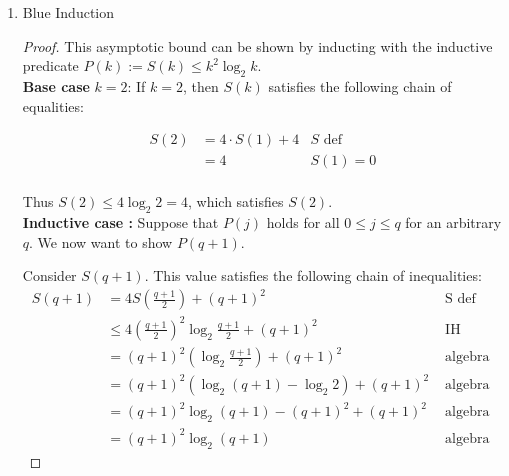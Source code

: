 \documentclass[10pt]{article}
\begin{document}
\begin{enumerate}[label={}]
\begin{proof}
                  Since the total work $k^2 \log _2 k$ is always less than or equal to $k^2 \log _2 k$ for $k \geq 1$, it follows that $S(k)=k^2 \log _2 k \in O\left(k^2 \log _2 k\right)$.

            \end{proof}

            \newpage

      \item Blue Induction
            \begin{proof}
                  This asymptotic bound can be shown by inducting with the inductive predicate $P(k):=S(k) \leq k^2 \log _2 k$.\\

                  \textbf{Base case} $k=2$: If $k=2$, then $S(k)$ satisfies the following chain of equalities:

                  $$
                        \begin{array}{rlrl}
                              S(2) & =4 \cdot S(1)+4 & S \text { def } \\
                                   & =4              & S(1) = 0        \\
                        \end{array}
                  $$


                  Thus $S(2) \leq 4 \log _2 2 = 4$, which satisfies $S(2)$.\\

                  \textbf{Inductive case :} Suppose that $P(j)$ holds for all $0 \leq j \leq q$ for an arbitrary $q$. We now want to show $P(q+1)$.

                  Consider $S(q+1)$. This value satisfies the following chain of inequalities:
                  $$
                        \begin{array}{rlr}
                              S(q+1) & =4 S\left(\frac{q+1}{2}\right)+(q+1)^2                           & \text { S def }   \\
                                     & \leq 4\left(\frac{q+1}{2}\right)^2 \log _2 \frac{q+1}{2}+(q+1)^2 & \text { IH }      \\
                                     & =(q+1)^2\left(\log _2 \frac{q+1}{2}\right)+(q+1)^2               & \text { algebra } \\
                                     & =(q+1)^2\left(\log _2(q+1)-\log _2 2\right)+(q+1)^2              & \text { algebra } \\
                                     & =(q+1)^2 \log _2(q+1)-(q+1)^2+(q+1)^2                            & \text { algebra } \\
                                     & =(q+1)^2 \log _2(q+1)                                            & \text { algebra }
                        \end{array}
                  $$




\end{proof}
\end{enumerate}
\end{document}
